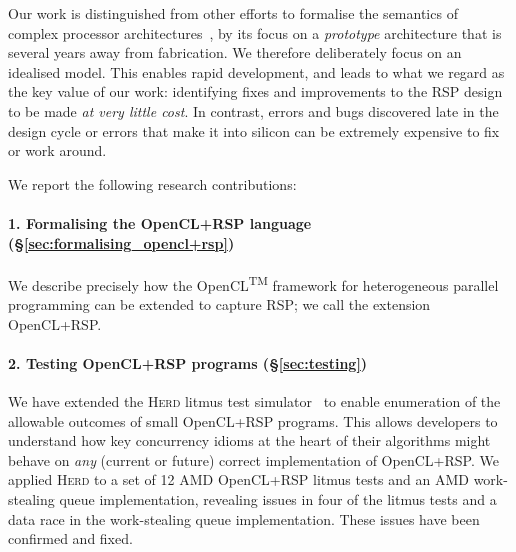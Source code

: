\documentclass[svgnames,10pt]{sigplanconf}
\theoremstyle{definition}
\newcommand\herd{\textsc{Herd}}
\begin{document}
Our work is distinguished from other efforts to formalise the
semantics of complex processor architectures~\cite{sarkar+11,
  alglave+15,
  sewell+10,Mador-Haim:2012:AMM:2362216.2362263,alglave+14}, by its
focus on a \emph{prototype} architecture that is several years away
from fabrication. We therefore deliberately focus on an idealised
model. This enables rapid development, and leads to what we regard as
the key value of our work: identifying fixes and improvements to the RSP
design to be made \emph{at very little cost}.  In contrast, errors and bugs
discovered late in the design cycle or errors that make it into
silicon can be extremely expensive to fix or work around.

We report the following research contributions:

\paragraph{1. Formalising the OpenCL+RSP language (\S\ref{sec:formalising_opencl+rsp})}
We describe precisely how the OpenCL\textsuperscript{TM} framework for
heterogeneous parallel programming can be extended to capture RSP; we
call the extension OpenCL+RSP.


\paragraph{2. Testing OpenCL+RSP programs (\S\ref{sec:testing})}
We have extended the \herd{} litmus test simulator~\cite{alglave+14}
to enable enumeration of the allowable outcomes of small OpenCL+RSP
programs. This allows developers to understand how key concurrency
idioms at the heart of their algorithms might behave on \emph{any}
(current or future) correct implementation of OpenCL+RSP. We applied
\herd{} to a set of 12 AMD OpenCL+RSP litmus tests and an AMD work-stealing
queue implementation, revealing issues in four of the litmus
tests and a data race in the work-stealing queue implementation. These
issues have been confirmed and fixed.

\end{document}
